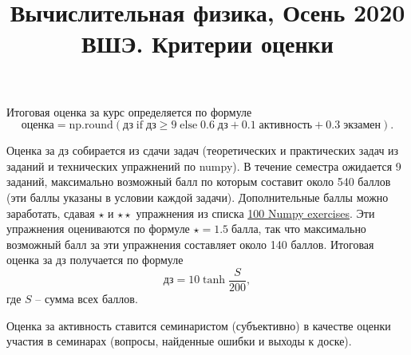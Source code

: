 \documentclass[prb,papersize=a4paper,notitlepage]{revtex4-1}%
\begin{document}
\title{Вычислительная физика, Осень 2020 ВШЭ. Критерии оценки}
\maketitle
Итоговая оценка за курс определяется по формуле $$\textrm{оценка} = \mathrm{np.round}(\textrm{дз}\;\mathrm{if}\;\textrm{дз} \geq 9\;\mathrm{else}\;0.6\;\textrm{дз} + 0.1\;\textrm{активность} + 0.3\;\textrm{экзамен}).$$

Оценка за дз собирается из сдачи задач (теоретических и практических задач из заданий и технических упражнений по numpy). В течение семестра ожидается 9 заданий, максимально возможный балл по которым составит около 540 баллов (эти баллы указаны в условии каждой задачи). Дополнительные баллы можно заработать, сдавая $\star$ и $\star\star$ упражнения из списка \href{https://github.com/rougier/numpy-100/blob/master/100_Numpy_exercises.md}{100 Numpy exercises}. Эти упражнения оцениваются по формуле $\star = 1.5 \;\textrm{балла}$, так что максимально возможный балл за эти упражнения составляет около 140 баллов. Итоговая оценка за дз получается по формуле $$\textrm{дз} = 10\tanh\frac{S}{200},$$ где $S$ -- сумма всех баллов.

Оценка за активность ставится семинаристом (субъективно) в качестве оценки участия в семинарах (вопросы, найденные ошибки и выходы к доске).
\end{document}
